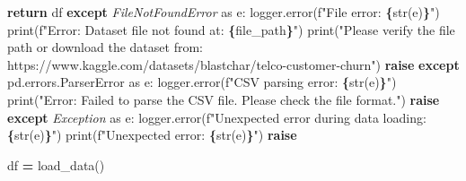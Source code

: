 \documentclass[preprint, 3p,
authoryear]{elsarticle} %
\newenvironment{Shaded}{\begin{snugshade}}{\end{snugshade}}
\newcommand{\BuiltInTok}[1]{#1}
\newcommand{\ControlFlowTok}[1]{\textcolor[rgb]{0.13,0.29,0.53}{\textbf{#1}}}
\newcommand{\ImportTok}[1]{#1}
\newcommand{\NormalTok}[1]{#1}
\newcommand{\OperatorTok}[1]{\textcolor[rgb]{0.81,0.36,0.00}{\textbf{#1}}}
\newcommand{\PreprocessorTok}[1]{\textcolor[rgb]{0.56,0.35,0.01}{\textit{#1}}}
\newcommand{\SpecialCharTok}[1]{\textcolor[rgb]{0.81,0.36,0.00}{\textbf{#1}}}
\newcommand{\SpecialStringTok}[1]{\textcolor[rgb]{0.31,0.60,0.02}{#1}}
\newcommand{\StringTok}[1]{\textcolor[rgb]{0.31,0.60,0.02}{#1}}
\begin{document}
\begin{Shaded}
\begin{Highlighting}[]
        \ControlFlowTok{return}\NormalTok{ df}
    \ControlFlowTok{except} \PreprocessorTok{FileNotFoundError} \ImportTok{as}\NormalTok{ e:}
\NormalTok{        logger.error(}\SpecialStringTok{f"File error: }\SpecialCharTok{\{}\BuiltInTok{str}\NormalTok{(e)}\SpecialCharTok{\}}\SpecialStringTok{"}\NormalTok{)}
        \BuiltInTok{print}\NormalTok{(}\SpecialStringTok{f"Error: Dataset file not found at: }\SpecialCharTok{\{}\NormalTok{file\_path}\SpecialCharTok{\}}\SpecialStringTok{"}\NormalTok{)}
        \BuiltInTok{print}\NormalTok{(}\StringTok{"Please verify the file path or download the dataset from: https://www.kaggle.com/datasets/blastchar/telco{-}customer{-}churn"}\NormalTok{)}
        \ControlFlowTok{raise}
    \ControlFlowTok{except}\NormalTok{ pd.errors.ParserError }\ImportTok{as}\NormalTok{ e:}
\NormalTok{        logger.error(}\SpecialStringTok{f"CSV parsing error: }\SpecialCharTok{\{}\BuiltInTok{str}\NormalTok{(e)}\SpecialCharTok{\}}\SpecialStringTok{"}\NormalTok{)}
        \BuiltInTok{print}\NormalTok{(}\StringTok{"Error: Failed to parse the CSV file. Please check the file format."}\NormalTok{)}
        \ControlFlowTok{raise}
    \ControlFlowTok{except} \PreprocessorTok{Exception} \ImportTok{as}\NormalTok{ e:}
\NormalTok{        logger.error(}\SpecialStringTok{f"Unexpected error during data loading: }\SpecialCharTok{\{}\BuiltInTok{str}\NormalTok{(e)}\SpecialCharTok{\}}\SpecialStringTok{"}\NormalTok{)}
        \BuiltInTok{print}\NormalTok{(}\SpecialStringTok{f"Unexpected error: }\SpecialCharTok{\{}\BuiltInTok{str}\NormalTok{(e)}\SpecialCharTok{\}}\SpecialStringTok{"}\NormalTok{)}
        \ControlFlowTok{raise}

\NormalTok{df }\OperatorTok{=}\NormalTok{ load\_data()}
\end{Highlighting}
\end{Shaded}
\end{document}
